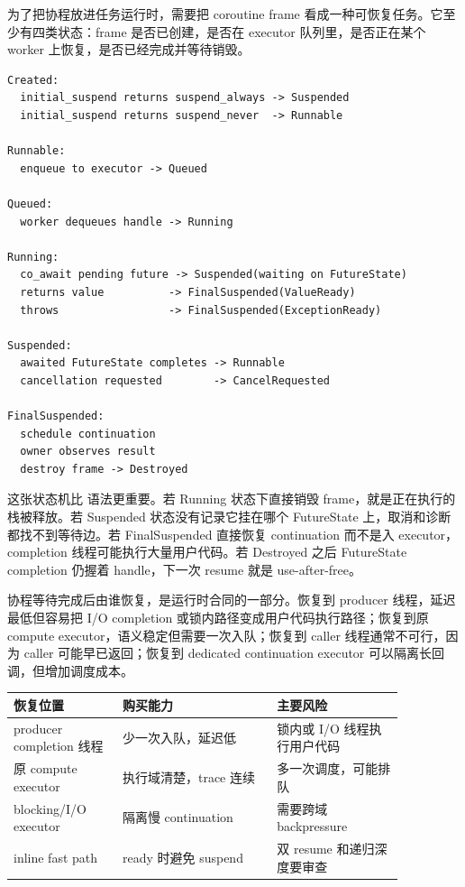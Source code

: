 为了把协程放进任务运行时，需要把 coroutine frame 看成一种可恢复任务。它至少有四类状态：frame 是否已创建，是否在 executor 队列里，是否正在某个 worker 上恢复，是否已经完成并等待销毁。

\begin{lstlisting}[numbers=none,caption={CoroutineTask 状态机}]
Created:
  initial_suspend returns suspend_always -> Suspended
  initial_suspend returns suspend_never  -> Runnable

Runnable:
  enqueue to executor -> Queued

Queued:
  worker dequeues handle -> Running

Running:
  co_await pending future -> Suspended(waiting on FutureState)
  returns value          -> FinalSuspended(ValueReady)
  throws                 -> FinalSuspended(ExceptionReady)

Suspended:
  awaited FutureState completes -> Runnable
  cancellation requested        -> CancelRequested

FinalSuspended:
  schedule continuation
  owner observes result
  destroy frame -> Destroyed
\end{lstlisting}

这张状态机比  语法更重要。若 Running 状态下直接销毁 frame，就是正在执行的栈被释放。若 Suspended 状态没有记录它挂在哪个 FutureState 上，取消和诊断都找不到等待边。若 FinalSuspended 直接恢复 continuation 而不是入 executor，completion 线程可能执行大量用户代码。若 Destroyed 之后 FutureState completion 仍握着 handle，下一次 resume 就是 use-after-free。

协程等待完成后由谁恢复，是运行时合同的一部分。恢复到 producer 线程，延迟最低但容易把 I/O completion 或锁内路径变成用户代码执行路径；恢复到原 compute executor，语义稳定但需要一次入队；恢复到 caller 线程通常不可行，因为 caller 可能早已返回；恢复到 dedicated continuation executor 可以隔离长回调，但增加调度成本。

\begin{center}
\small
\begin{tabular}{p{0.24\linewidth}p{0.34\linewidth}p{0.28\linewidth}}
\toprule
恢复位置 & 购买能力 & 主要风险 \\
\midrule
producer completion 线程 & 少一次入队，延迟低 & 锁内或 I/O 线程执行用户代码 \\
原 compute executor & 执行域清楚，trace 连续 & 多一次调度，可能排队 \\
blocking/I/O executor & 隔离慢 continuation & 需要跨域 backpressure \\
inline fast path & ready 时避免 suspend & 双 resume 和递归深度要审查 \\
\bottomrule
\end{tabular}
\end{center}

